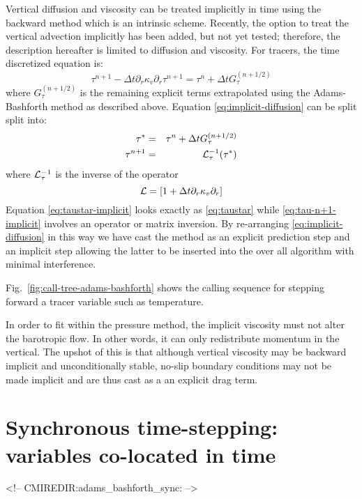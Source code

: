 Vertical diffusion and viscosity can be treated implicitly in time
using the backward method which is an intrinsic scheme. 
Recently, the option to treat the vertical advection 
implicitly has been added, but not yet tested; therefore, 
the description hereafter is limited to diffusion and viscosity.
For tracers,
the time discretized equation is:
\begin{equation}
\tau^{n+1} - \Delta t \partial_r \kappa_v \partial_r \tau^{n+1} =
\tau^{n} + \Delta t G_\tau^{(n+1/2)}
\label{eq:implicit-diffusion}
\end{equation}
where $G_\tau^{(n+1/2)}$ is the remaining explicit terms extrapolated
using the Adams-Bashforth method as described above.  Equation
\ref{eq:implicit-diffusion} can be split split into:
\begin{eqnarray}
\tau^* & = & \tau^{n} + \Delta t G_\tau^{(n+1/2)}
\label{eq:taustar-implicit} \\
\tau^{n+1} & = & {\cal L}_\tau^{-1} ( \tau^* )
\label{eq:tau-n+1-implicit}
\end{eqnarray}
where ${\cal L}_\tau^{-1}$ is the inverse of the operator
\begin{equation}
{\cal L} = \left[ 1 + \Delta t \partial_r \kappa_v \partial_r \right]
\end{equation}
Equation \ref{eq:taustar-implicit} looks exactly as \ref{eq:taustar}
while \ref{eq:tau-n+1-implicit} involves an operator or matrix
inversion. By re-arranging \ref{eq:implicit-diffusion} in this way we
have cast the method as an explicit prediction step and an implicit
step allowing the latter to be inserted into the over all algorithm
with minimal interference.

Fig.~\ref{fig:call-tree-adams-bashforth} shows the calling sequence for
stepping forward a tracer variable such as temperature.

In order to fit within the pressure method, the implicit viscosity
must not alter the barotropic flow. In other words, it can only
redistribute momentum in the vertical. The upshot of this is that
although vertical viscosity may be backward implicit and
unconditionally stable, no-slip boundary conditions may not be made
implicit and are thus cast as a an explicit drag term.

\section{Synchronous time-stepping: variables co-located in time}
\label{sect:adams-bashforth-sync}
\begin{rawhtml}
<!-- CMIREDIR:adams_bashforth_sync: -->
\end{rawhtml}

